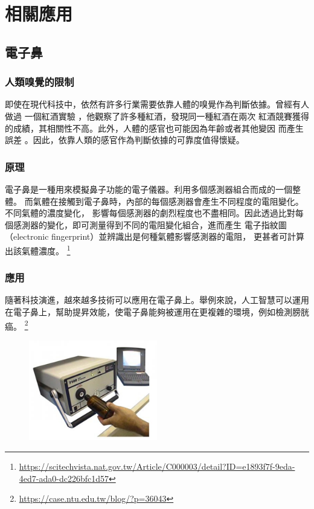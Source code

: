 \chapter{相關應用}

\section{電子鼻}
\subsection{人類嗅覺的限制}
即使在現代科技中，依然有許多行業需要依靠人體的嗅覺作為判斷依據。曾經有人做過
一個紅酒實驗 \cite{hodgson_2008} ，他觀察了許多種紅酒，發現同一種紅酒在兩次
紅酒競賽獲得的成績，其相關性不高。此外，人體的感官也可能因為年齡或者其他變因
而產生誤差 \cite{Hugh2015} 。因此，依靠人類的感官作為判斷依據的可靠度值得懷疑。
\subsection{原理}
電子鼻是一種用來模擬鼻子功能的電子儀器。利用多個感測器組合而成的一個整體。
而氣體在接觸到電子鼻時，內部的每個感測器會產生不同程度的電阻變化。不同氣體的濃度變化，
影響每個感測器的劇烈程度也不盡相同。因此透過比對每個感測器的變化，即可測量得到不同的電阻變化組合，進而產生
電子指紋圖（electronic fingerprint）並辨識出是何種氣體影響感測器的電阻，
更甚者可計算出該氣體濃度。 \footnote{\url{https://scitechvista.nat.gov.tw/Article/C000003/detail?ID=e1893f7f-9eda-4ed7-ada0-dc226bfc1d57}}
\subsection{應用}
隨著科技演進，越來越多技術可以應用在電子鼻上。舉例來說，人工智慧可以運用
在電子鼻上，幫助提昇效能，使電子鼻能夠被運用在更複雜的環境，例如檢測膀胱癌。 \footnote{\url{https://case.ntu.edu.tw/blog/?p=36043}}
\begin{figure}[H]
	\centering
	\includegraphics[width=0.5\textwidth]{pic/nose.png}
\end{figure}

